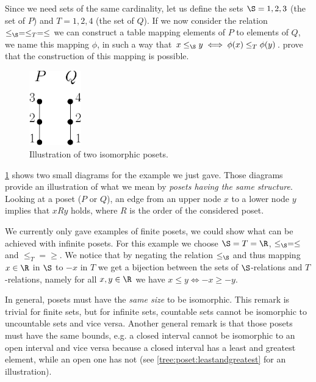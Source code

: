 Since we need sets of the same cardinality, let us define the sets $\S = {1, 2,
3}$ (the set of $P$) and $T = {1, 2, 4}$ (the set of $Q$). If we now consider
the relation $\le_{\S} = \le_T = \le$ we can construct a table mapping elements of
$P$ to elements of $Q$, we name this mapping $\phi$, in such a way that $x
\le_{\S} y \iff \phi(x) \le_T \phi(y)$. 
prove that the construction of this mapping is possible.

\begin{figure}
	\centering
	\includegraphics[width=0.2\textwidth]{fig/poset/iso/a}
	\caption{Illustration of two isomorphic posets.}
	\label{fig:poset:iso:a}
\end{figure}

\ref{fig:poset:iso:a} shows two small diagrams for the example we just gave.
Those diagrams provide an illustration of what we mean by \emph{posets having
the same structure}. Looking at a poset ($P$ or $Q$), an edge from an upper
node $x$ to a lower node $y$ implies that $x R y$ holds, where $R$ is the order
of the considered poset.


We currently only gave examples of finite posets, we could show what can be
achieved with infinite posets. For this example we choose $\S = T = \R$,
$\le_{\S} = \le$ and $\le_T = \ge$. We notice that by negating the relation
$\le_{\S}$ and thus mapping $x \in \R$ in $\S$ to $-x$ in $T$ we get a
bijection between the sets of $\S$-relations and $T$-relations, namely for all
$x, y \in \R$ we have $x \le y \iff -x \ge -y$.

In general, posets must have the \emph{same size} to be isomorphic. This remark
is trivial for finite sets, but for infinite sets, countable sets cannot be
isomorphic to uncountable sets and vice versa. Another general remark is that
those posets must have the same bounds, e.g. a closed interval cannot be
isomorphic to an open interval and vice versa because a closed interval has a
least and greatest element, while an open one has not (see
\ref{tree:poset:leastandgreatest} for an illustration).

